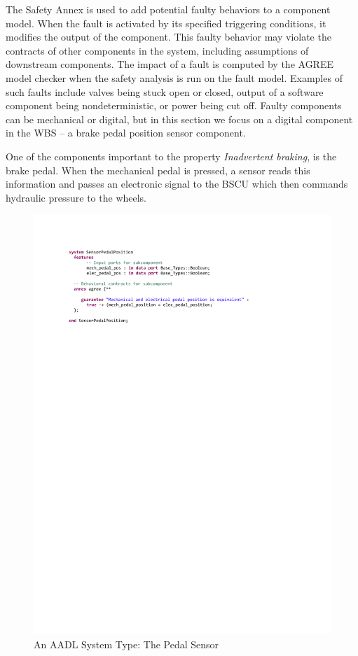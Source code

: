 The Safety Annex is used to add potential faulty behaviors to a component model.  When the fault is activated by its specified triggering conditions, it modifies the output of the component. This faulty behavior may violate the contracts of other components in the system, including assumptions of downstream components. The impact of a fault is computed by the AGREE model checker when the safety analysis is run on the fault model. Examples of such faults include valves being stuck open or closed, output of a software component being nondeterministic, or power being cut off. Faulty components can be mechanical or digital, but in this section we focus on a digital component in the WBS -- a brake pedal position sensor component. 

One of the components important to the property \textit{Inadvertent braking}, is the brake pedal. When the mechanical pedal is pressed, a sensor reads this information and passes an electronic signal to the BSCU which then commands hydraulic pressure to the wheels. 

\begin{figure}[h!]
	\hspace*{-2cm}
	\vspace{-0.4in} 
	\begin{center}
		\includegraphics[trim=0 640 -10 70,clip,width=1.5\dimexpr\textwidth-2cm\relax]{images/system_sensor.pdf}
		\caption{An AADL System Type: The Pedal Sensor}
		\label{fig:sensor}
	\end{center}
	\vspace{-0.3in}
\end{figure}

